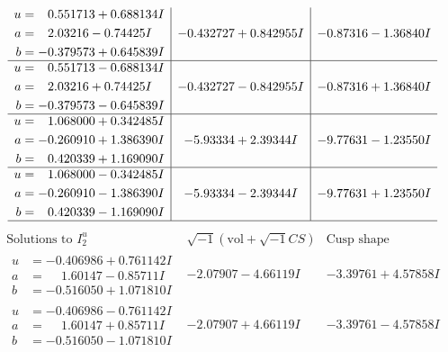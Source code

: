 \documentclass[1p]{elsarticle_modified}
\theoremstyle{definition}
\newcommand{\I}{\sqrt{-1}}
\begin{document}
$$\begin{array}{c|c|c}
\begin{aligned}
u &= \phantom{-}0.551713 + 0.688134 I \\
a &= \phantom{-}2.03216 - 0.74425 I \\
b &= -0.379573 + 0.645839 I\end{aligned}
 & -0.432727 + 0.842955 I & -0.87316 - 1.36840 I \\ \hline\begin{aligned}
u &= \phantom{-}0.551713 - 0.688134 I \\
a &= \phantom{-}2.03216 + 0.74425 I \\
b &= -0.379573 - 0.645839 I\end{aligned}
 & -0.432727 - 0.842955 I & -0.87316 + 1.36840 I \\ \hline\begin{aligned}
u &= \phantom{-}1.068000 + 0.342485 I \\
a &= -0.260910 + 1.386390 I \\
b &= \phantom{-}0.420339 + 1.169090 I\end{aligned}
 & -5.93334 + 2.39344 I & -9.77631 - 1.23550 I \\ \hline\begin{aligned}
u &= \phantom{-}1.068000 - 0.342485 I \\
a &= -0.260910 - 1.386390 I \\
b &= \phantom{-}0.420339 - 1.169090 I\end{aligned}
 & -5.93334 - 2.39344 I & -9.77631 + 1.23550 I\\
 \hline 
 \end{array}$$\newpage$$\begin{array}{c|c|c}  
\text{Solutions to }I^u_{2}& \I (\text{vol} + \sqrt{-1}CS) & \text{Cusp shape}\\
 \hline 
\begin{aligned}
u &= -0.406986 + 0.761142 I \\
a &= \phantom{-}1.60147 - 0.85711 I \\
b &= -0.516050 + 1.071810 I\end{aligned}
 & -2.07907 - 4.66119 I & -3.39761 + 4.57858 I \\ \hline\begin{aligned}
u &= -0.406986 - 0.761142 I \\
a &= \phantom{-}1.60147 + 0.85711 I \\
b &= -0.516050 - 1.071810 I\end{aligned}
 & -2.07907 + 4.66119 I & -3.39761 - 4.57858 I \\ \hline\begin{aligned}

\end{aligned}
\end{array}$$
\end{document}
